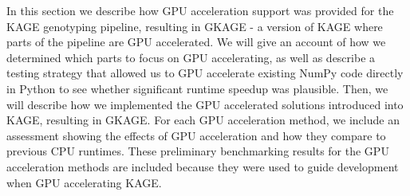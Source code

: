 In this section we describe how GPU acceleration support was provided for the KAGE genotyping pipeline, resulting in GKAGE - a version of KAGE where parts of the pipeline are GPU accelerated.
We will give an account of how we determined which parts to focus on GPU accelerating, as well as describe a testing strategy that allowed us to GPU accelerate existing NumPy code directly in Python to see whether significant runtime speedup was plausible.
Then, we will describe how we implemented the GPU accelerated solutions introduced into KAGE, resulting in GKAGE.
For each GPU acceleration method, we include an assessment showing the effects of GPU acceleration and how they compare to previous CPU runtimes.
These preliminary benchmarking results for the GPU acceleration methods are included because they were used to guide development when GPU accelerating KAGE.

